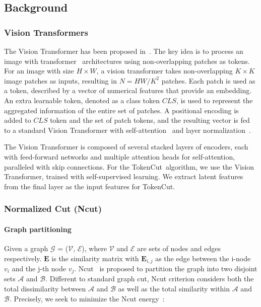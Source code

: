 \documentclass[twocolumn]{article}
\newcommand{\name} {TokenCut}
\begin{document}
\subsection{Background}
\subsubsection{Vision Transformers}
\label{sec:visiontransformers}
The Vision Transformer has been proposed in~\cite{dosovitskiy2020image}. The key idea is to process an image with transformer~\cite{vaswani2017attention} architectures using non-overlapping patches as tokens. For an image with size $H \times W$, a vision transformer takes non-overlapping $ K \times K $ image patches as inputs, resulting in $N=HW/K^{2}$ patches. 
Each patch is used as a token, described by a vector of numerical features that provide an embedding. An extra learnable token, denoted as a class token $CLS$, is used to represent the aggregated information of the entire set of patches. A positional encoding is added to $CLS$ token and the set of patch tokens, and the resulting vector is fed to a standard Vision Transformer with self-attention~\cite{vaswani2017attention} and layer normalization~\cite{ba2016layer}.

The Vision Transformer is composed of several stacked layers of encoders, each with feed-forward networks and multiple attention heads for self-attention, paralleled with skip connections. 
For the \name~algorithm, we use the Vision Transformer, trained with self-supervised learning. We  extract latent features from the final layer as the input features for \name.


\subsubsection{Normalized Cut (Ncut)}
\label{sec:ncut}
\paragraph*{Graph partitioning} 
Given a graph $\mathcal{G}$ = ($\mathcal{V}$, $\mathcal{E}$), where $\mathcal{V}$ and $\mathcal{E}$ are sets of nodes and edges respectively. $\mathbf{E}$ is the similarity matrix with $\mathbf{E}_{i,j}$ as the edge between the i-node $v_i$ and the j-th node $v_j$. Ncut~\cite{shi2000normalized} is proposed to partition the graph into two disjoint sets $\mathcal{A}$ and $\mathcal{B}$. Different to standard graph cut, 
Ncut criterion considers both the total dissimilarity between $\mathcal{A}$ and $\mathcal{B}$ as well as the total similarity within $\mathcal{A}$ and $\mathcal{B}$. Precisely, we seek to minimize the Ncut energy~\cite{shi2000normalized}:
\end{document}
